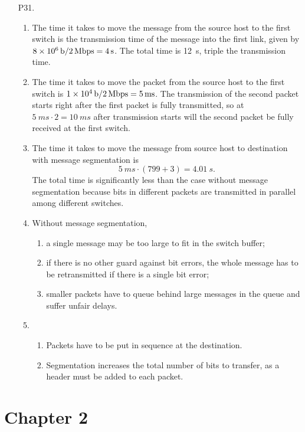 \documentclass{article}
\begin{document}
\begin{enumerate}
    \item[P31.] \begin{enumerate}
        \item The time it takes to move the message from the source host to the first switch is the transmission time of the message into the first link, given by $\SI{8d6}{b} / \SI{2}{Mbps} = \SI{4}{s}$. The total time is \SI{12}{s}, triple the transmission time.
        \item The time it takes to move the packet from the source host to the first switch is $\SI{1d4}{b} / \SI{2}{Mbps} = \SI{5}{ms}$. The transmission of the second packet starts right after the first packet is fully transmitted, so at $\SI{5}{ms} \cdot 2 = \SI{10}{ms}$ after transmission starts will the second packet be fully received at the first switch.
        \item The time it takes to move the message from source host to destination with message segmentation is
        \[
            \SI{5}{ms} \cdot (799 + 3) = \SI{4.01}{s}.
        \]
        The total time is significantly less than the case without message segmentation because bits in different packets are transmitted in parallel among different switches.
        \item Without message segmentation,
        \begin{enumerate}
            \item a single message may be too large to fit in the switch buffer;
            \item if there is no other guard against bit errors, the whole message has to be retransmitted if there is a single bit error;
            \item smaller packets have to queue behind large messages in the queue and suffer unfair delays.
        \end{enumerate}
        \item \begin{enumerate}
            \item Packets have to be put in sequence at the destination.
            \item Segmentation increases the total number of bits to transfer, as a header must be added to each packet.
        \end{enumerate}
    \end{enumerate}
\end{enumerate}

\section*{Chapter 2}
\end{document}
